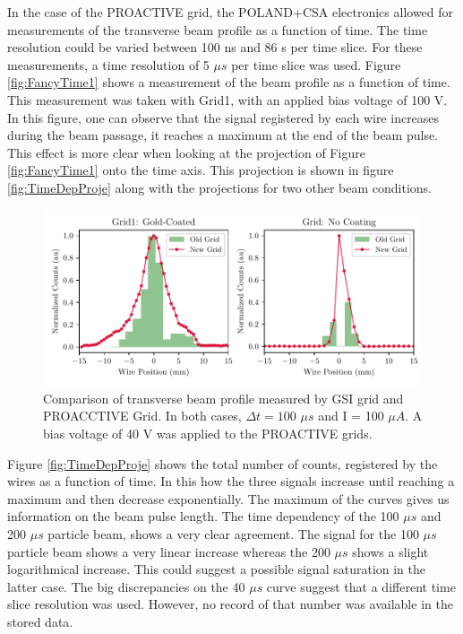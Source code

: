 In the case of the PROACTIVE grid, the POLAND+CSA electronics \parencite[]{ref:ElectronicsSEMgsi} allowed for measurements of the transverse beam profile as a function of time. The time resolution could be varied between 100 ns and 86 s per time slice. For these measurements, a time resolution of 5 $\mu s$ per time slice was used. Figure \ref{fig:FancyTime1} shows a measurement of the beam profile as a function of time. This measurement was taken with Grid1, with an applied bias voltage of 100 V. In this figure, one can observe that the signal registered by each wire increases during the beam passage, it reaches a maximum at the end of the beam pulse. This effect is more clear when looking at the projection of Figure \ref{fig:FancyTime1}  onto the time axis. This projection is shown in figure \ref{fig:TimeDepProje} along with the projections for two other beam conditions. 

\begin{figure}[h]
    \centering
    \includegraphics[width=1.0\columnwidth]{OldNewProfileCompa/OldNewProfileCompa.pdf}
    \caption{Comparison of transverse beam profile measured by GSI grid and PROACCTIVE Grid. In both cases, $\Delta t = 100 $ $\mu s$ and I = 100 $\mu A$. A bias voltage of 40 V was applied to the PROACTIVE grids.}
    \label{fig:OldNewProfCompa}
\end{figure}


Figure \ref{fig:TimeDepProje} shows the total number of counts, registered by the wires as a function of time. In this how the three signals increase until reaching a maximum and then decrease exponentially. The maximum of the curves gives us information on the beam pulse length. The time dependency of the 100 $\mu s$ and 200 $\mu s$ particle beam, shows a very clear agreement. The signal for the 100 $\mu s$ particle beam shows a very linear increase whereas the 200 $\mu s$ shows a slight logarithmical increase. This could suggest a possible signal saturation in the latter case. The big discrepancies on the 40 $\mu s$ curve suggest that a different time slice resolution was used. However, no record of that number was available in the stored data. 


